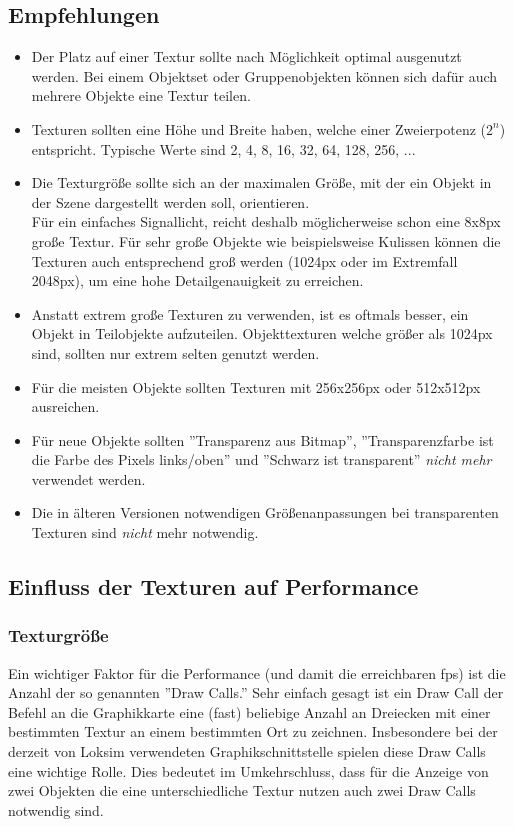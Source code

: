 \subsection{Empfehlungen}
\begin{itemize}
\item Der Platz auf einer Textur sollte nach Möglichkeit optimal ausgenutzt werden. Bei einem Objektset oder Gruppenobjekten können sich dafür auch mehrere Objekte eine Textur teilen.
\item Texturen sollten eine Höhe und Breite haben, welche einer Zweierpotenz ($2^{n}$) entspricht. Typische Werte sind 2, 4, 8, 16, 32, 64, 128, 256, ...
\item Die Texturgröße sollte sich an der maximalen Größe, mit der ein Objekt in der Szene dargestellt werden soll, orientieren.\\
Für ein einfaches Signallicht, reicht deshalb möglicherweise schon eine 8x8px große Textur. Für sehr große Objekte wie beispielsweise Kulissen können die Texturen auch entsprechend groß werden (1024px oder im Extremfall 2048px), um eine hohe Detailgenauigkeit zu erreichen.
\item Anstatt extrem große Texturen zu verwenden, ist es oftmals besser, ein Objekt in Teilobjekte aufzuteilen. Objekttexturen welche größer als 1024px sind, sollten nur extrem selten genutzt werden.
\item Für die meisten Objekte sollten Texturen mit 256x256px oder 512x512px ausreichen.
\item Für neue Objekte sollten ''Transparenz aus Bitmap'', ''Transparenzfarbe ist die Farbe des Pixels links/oben'' und ''Schwarz ist transparent''  \emph{nicht mehr} verwendet werden. 
\item Die in älteren Versionen notwendigen Größenanpassungen bei transparenten Texturen sind \emph{nicht} mehr notwendig. 
\end{itemize}

\subsection{Einfluss der Texturen auf Performance}
\subsubsection{Texturgröße}
Ein wichtiger Faktor für die Performance (und damit die erreichbaren fps) ist die Anzahl der so genannten ''Draw Calls.'' Sehr einfach gesagt ist ein Draw Call der Befehl an die Graphikkarte eine (fast) beliebige Anzahl an Dreiecken mit einer bestimmten Textur an einem bestimmten Ort zu zeichnen. Insbesondere bei der derzeit von Loksim verwendeten Graphikschnittstelle spielen diese Draw Calls eine wichtige Rolle.
Dies bedeutet im Umkehrschluss, dass für die Anzeige von zwei Objekten die eine unterschiedliche Textur nutzen auch zwei Draw Calls notwendig sind.


